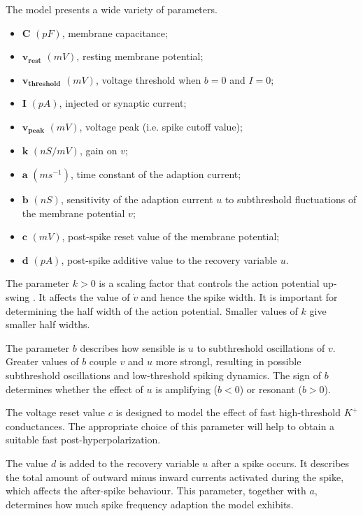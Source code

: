 \documentclass[10pt,a4paper, final]{report} %
\begin{document}
The model presents a wide variety of parameters.
\begin{itemize}
\item $\bm{C}$ $(pF)$, membrane capacitance;
\item $\bm{v_{rest}}$ $(mV)$, resting membrane potential;
\item $\bm{v_{threshold}}$ $(mV)$, voltage threshold when $b=0$ and $I = 0$;
\item $\bm{I}$ $(pA)$, injected or synaptic current;
\item $\bm{v_{peak}}$ $(mV)$, voltage peak (i.e. spike cutoff value);
\item $\bm{k}$ $(nS/mV)$, gain on $v$; 
\item $\bm{a}$ $(ms^{-1})$, time constant of the adaption current;
\item $\bm{b}$ $(nS)$, sensitivity of the adaption current $u$ to subthreshold fluctuations of the membrane potential $v$;
\item $\bm{c}$ $(mV)$, post-spike reset value of the membrane potential;
\item $\bm{d}$ $(pA)$, post-spike additive value to the recovery variable $u$. 
\end{itemize}

The parameter $k >0$ is a scaling factor that controls the action potential up-swing \cite{dur2012network}. It affects the value of $\dot{v}$ and hence the spike width. It is important for determining the half width of the action potential. Smaller values of $k$ give smaller half widths. 

The parameter $b$ describes how sensible is $u$ to subthreshold oscillations of $v$. Greater values of $b$ couple $v$ and $u$ more strongl, resulting in possible subthreshold oscillations and low-threshold spiking dynamics.  
The sign of $b$ determines whether the effect of $u$ is amplifying ($b < 0$) or resonant ($b >0$).

The voltage reset value $c$ is designed to model the effect of fast high-threshold $K^+$ conductances. The appropriate choice of this parameter will help to obtain a suitable fast post-hyperpolarization.

The value $d$ is added to the recovery variable $u$ after a spike occurs. It describes the total amount of outward minus inward currents activated during the spike, which affects the after-spike behaviour. This parameter, together with $a$, determines how much spike frequency adaption the model exhibits. 
\end{document}
